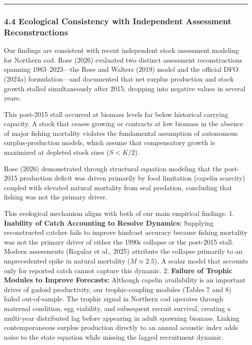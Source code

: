 \documentclass[11pt]{article}
\begin{document}
\begin{center}\rule{0.5\linewidth}{0.5pt}\end{center}

\subsubsection{4.4 Ecological Consistency with Independent Assessment
Reconstructions}\label{ecological-consistency-with-independent-assessment-reconstructions}

Our findings are consistent with recent independent stock assessment
modeling for Northern cod. Rose (2026) evaluated two distinct assessment
reconstructions spanning 1983--2023---the Rose and Walters (2019) model
and the official DFO (2024a) formulation---and documented that net
surplus production and stock growth stalled simultaneously after 2015,
dropping into negative values in several years.

This post-2015 stall occurred at biomass levels far below historical
carrying capacity. A stock that ceases growing or contracts at low
biomass in the absence of major fishing mortality violates the
fundamental assumption of autonomous surplus-production models, which
assume that compensatory growth is maximized at depleted stock sizes
(\(S < K/2\)).

Rose (2026) demonstrated through structural equation modeling that the
post-2015 production deficit was driven primarily by food limitation
(capelin scarcity) coupled with elevated natural mortality from seal
predation, concluding that fishing was not the primary driver.

This ecological mechanism aligns with both of our main empirical
findings: 1. \textbf{Inability of Catch Accounting to Resolve Dynamics:}
Supplying reconstructed catches fails to improve hindcast accuracy
because fishing mortality was not the primary driver of either the 1990s
collapse or the post-2015 stall. Modern assessments (Regular et al.,
2025) attribute the collapse primarily to an unprecedented spike in
natural mortality (\(M \approx 2.5\)). A scalar model that accounts only
for reported catch cannot capture this dynamic. 2. \textbf{Failure of
Trophic Modules to Improve Forecasts:} Although capelin availability is
an important driver of gadoid productivity, our trophic-coupling modules
(Tables 7 and 8) failed out-of-sample. The trophic signal in Northern
cod operates through maternal condition, egg viability, and subsequent
recruit survival, creating a multi-year distributed lag before appearing
in adult spawning biomass. Linking contemporaneous surplus production
directly to an annual acoustic index adds noise to the state equation
while missing the lagged recruitment dynamic.
\end{document}
